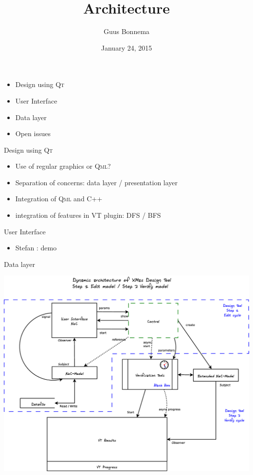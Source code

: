 \documentclass[11pt]{beamer}
\author{Guus Bonnema}
\title{Architecture}
\institute{Open University\\team033\\Guus Bonnema, Stefan Versluys, Jeroen Kleijn}
\date{January 24, 2015}
\begin{document}
\newcommand{\Noc}{\textsc{NoC}\xspace}
\newcommand{\qt}{\textsc{Qt}\xspace}
\newcommand{\qml}{\textsc{Qml}\xspace}

\begin{frame}
\titlepage
\end{frame}

\begin{frame}
	\begin{itemize}
		\item Design using \qt  
		\item User Interface
		\item Data layer
		\item Open issues
	\end{itemize}
\end{frame}

\begin{frame}{Design using \qt}

	\begin{itemize}
		\item Use of regular graphics or \qml?
		\item Separation of concerns: data layer / presentation layer
		\item Integration of \qml and C++
		\item integration of features in VT plugin: DFS / BFS
	\end{itemize}

\end{frame}

\begin{frame}{User Interface}

	\begin{itemize}
		\item Stefan : demo
	\end{itemize}

\end{frame}

\begin{frame}{Data layer}

	\includegraphics[width=.95\linewidth]{1c-architecture-dynamic}

\end{frame}
\end{document}
